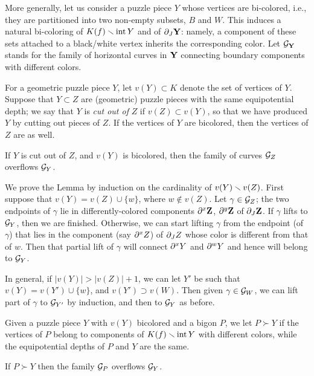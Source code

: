 More generally, let us consider a puzzle piece $Y$ whose vertices are bi-colored, 
i.e., they are partitioned into two non-empty subsets, $B$ and $W$. 
This induces a natural bi-coloring of $K(f)\smallsetminus \operatorname{int} Y$ and of $\partial_J{\mathbf{Y}}$:
namely, a component of these sets  attached to a black/white vertex inherits the
corresponding color. 
Let ${\mathcal G}_{\mathbf{Y}}$ stands for the family of horizontal  curves in ${\mathbf{Y}}$ 
connecting boundary components with different colors. 

For a geometric puzzle piece $Y$, 
let $v(Y) \subset K$ denote the set of vertices of $Y$.
Suppose that $Y \subset Z$ are (geometric) puzzle pieces with the same equipotential depth;
we say that $Y$ is \emph{cut out of} $Z$ if $v(Z) \subset v(Y)$,
so that we have produced $Y$ by cutting out pieces of $Z$.
If the vertices of $Y$ are bicolored,
then the vertices of $Z$ are as well.

\begin{lem} \label{cut out}
  If $Y$ is cut out of $Z$,
  and $v(Y)$ is bicolored,
  then the family of curves ${\mathcal G}_Z$ overflows ${\mathcal G}_Y$.
\end{lem}

\begin{pf}
  We prove the Lemma by induction on the cardinality of $v(Y) \smallsetminus v(Z)$.
  First suppose that $v(Y) = v(Z) \cup \{w\}$, 
  where $w \notin v(Z)$.
  Let $\gamma \in {\mathcal G}_Z$;
  the two endpoints of $\gamma$ lie in differently-colored components $\partial^x {\mathbf{Z}}$, $\partial^y {\mathbf{Z}}$
  of $\partial_J {\mathbf{Z}}$.
  If $\gamma$ lifts to ${\mathcal G}_Y$, 
  then we are finished.
  Otherwise, 
  we can start lifting $\gamma$ from the endpoint (of $\gamma$)
  that lies in the component (say $\partial^x Z$) of $\partial_J Z$
  whose color is different from that of $w$.
  Then that partial lift of $\gamma$ will connect $\partial^x Y$ and $\partial^w Y$
  and hence will belong to ${\mathcal G}_Y$.
  
  In general,
  if $|v(Y)| > |v(Z)| + 1$,
  we can let $Y'$ be such that 
  $v(Y) = v(Y') \cup \{w\}$,
  and $v(Y') \supset v(W)$.
  Then given $\gamma \in {\mathcal G}_W$,
  we can lift part of $\gamma$ to ${\mathcal G}_{Y'}$ by induction,
  and then to ${\mathcal G}_Y$ as before.
\end{pf}

Given a puzzle piece $Y$ with $v(Y)$ bicolored
and  a bigon $P$,
we let $P\succ Y$ if the vertices of $P$ belong to components of $K(f)\smallsetminus \operatorname{int} Y$
with different colors,
while the equipotential depths of $P$ and $Y$ are the same. 

\begin{lem}\label{overflowing}
  If $P\succ Y$ then the family ${\mathcal G}_P$ overflows  ${\mathcal G}_Y$.
\end{lem}

